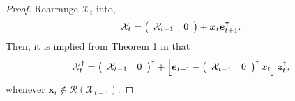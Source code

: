 \documentclass[journal]{IEEEtran}
\theoremstyle{definition}
\theoremstyle{remark}
\newcommand\x{{\bm x}}
\newcommand\z{{\bm z}}
\newcommand \e{{\bm e}}
\begin{document}
\begin{proof}
    Rearrange $\mathcal{X}_t$ into,
    \begin{align*}
        \mathcal{X}_t = \left(\begin{array}{*2{c}}
            \mathcal{X}_{t-1} & 0
        \end{array}\right) + \x_t \e_{t+1}^\intercal.
    \end{align*}
    Then, it is implied from Theorem 1 in \cite{Meyer1973generalized} that
    \begin{align*}
		\mathcal{X}_t^{\dagger} = \left(\begin{array}{*2{c}}
		    \mathcal{X}_{t-1} & 0
		\end{array}\right)^\dagger
		+ \left[ \e_{t+1}-\left(\begin{array}{*2{c}}
		    \mathcal{X}_{t-1} & 0
		\end{array}\right)^\dagger \x_t \right] \z_t^\dagger,
	\end{align*}
	whenever $\x_t\not\in\mathcal{R}(\mathcal{X}_{t-1})$.

\end{proof}
\end{document}

